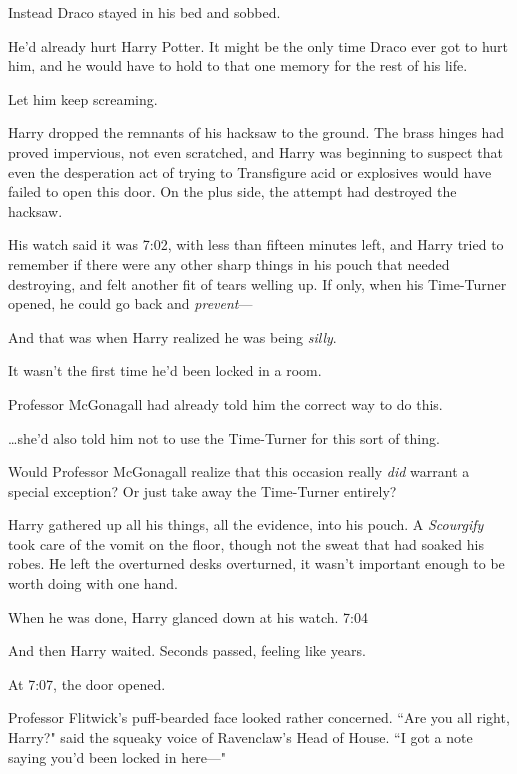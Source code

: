 Instead Draco stayed in his bed and sobbed.

He'd already hurt Harry Potter. It might be the only time Draco ever got to hurt him, and he would have to hold to that one memory for the rest of his life.

Let him keep screaming.

\later

Harry dropped the remnants of his hacksaw to the ground. The brass hinges had proved impervious, not even scratched, and Harry was beginning to suspect that even the desperation act of trying to Transfigure acid or explosives would have failed to open this door. On the plus side, the attempt had destroyed the hacksaw.

His watch said it was 7:02\pm, with less than fifteen minutes left, and Harry tried to remember if there were any other sharp things in his pouch that needed destroying, and felt another fit of tears welling up. If only, when his Time-Turner opened, he could go back and \emph{prevent}—

And that was when Harry realized he was being \emph{silly}.

It wasn't the first time he'd been locked in a room.

Professor McGonagall had already told him the correct way to do this.

{\ldots}she'd also told him not to use the Time-Turner for this sort of thing.

Would Professor McGonagall realize that this occasion really \emph{did} warrant a special exception? Or just take away the Time-Turner entirely?

Harry gathered up all his things, all the evidence, into his pouch. A \emph{Scourgify} took care of the vomit on the floor, though not the sweat that had soaked his robes. He left the overturned desks overturned, it wasn't important enough to be worth doing with one hand.

When he was done, Harry glanced down at his watch. 7:04\pm

And then Harry waited. Seconds passed, feeling like years.

At 7:07\pm, the door opened.

Professor Flitwick's puff-bearded face looked rather concerned. ``Are you all right, Harry?" said the squeaky voice of Ravenclaw's Head of House. ``I got a note saying you'd been locked in here—"

